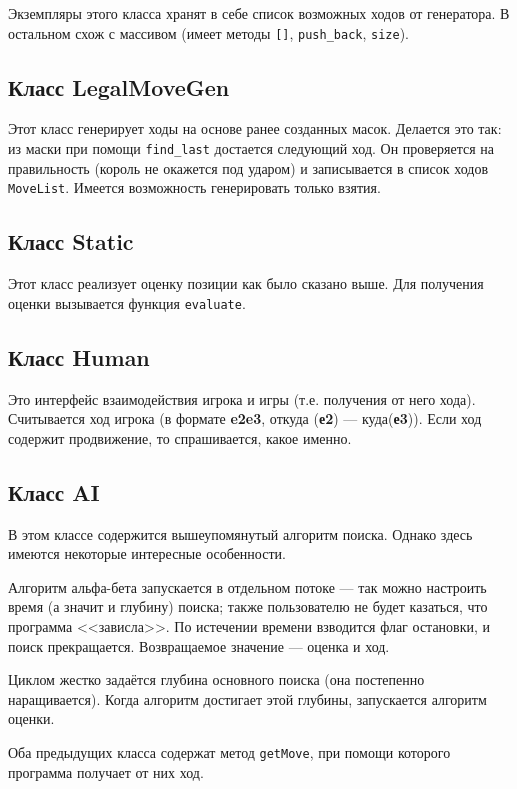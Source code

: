 Экземпляры этого класса хранят в себе список возможных ходов от генератора. В остальном схож с массивом (имеет методы \texttt{[]}, \texttt{push\_back}, \texttt{size}).

\subsection*{Класс LegalMoveGen}

Этот класс генерирует ходы на основе ранее созданных масок. Делается это так: из маски при помощи \texttt{find\_last} достается следующий ход. Он проверяется на правильность (король не окажется под ударом) и записывается в список ходов \texttt{MoveList}. Имеется возможность генерировать только взятия.

\subsection*{Класс Static}

Этот класс реализует оценку позиции как было сказано выше. Для получения оценки вызывается функция \texttt{evaluate}.

\subsection*{Класс Human}

Это интерфейс взаимодействия игрока и игры (т.е. получения от него хода). Считывается ход игрока (в формате \textbf{e2e3}, откуда (\textbf{е2}) --- куда(\textbf{е3})). Если ход содержит продвижение, то спрашивается, какое именно.

\subsection*{Класс AI}

В этом классе содержится вышеупомянутый алгоритм поиска.  Однако здесь имеются некоторые интересные особенности.

Алгоритм альфа-бета запускается в отдельном потоке --- так можно настроить время (а значит и глубину) поиска; также пользователю не будет казаться, что программа <<зависла>>. По истечении времени взводится флаг остановки, и поиск прекращается. Возвращаемое значение --- оценка и ход.

Циклом жестко задаётся глубина основного поиска (она постепенно наращивается). Когда алгоритм достигает этой глубины, запускается алгоритм оценки.

Оба предыдущих класса содержат метод \texttt{getMove}, при помощи которого программа получает от них ход.